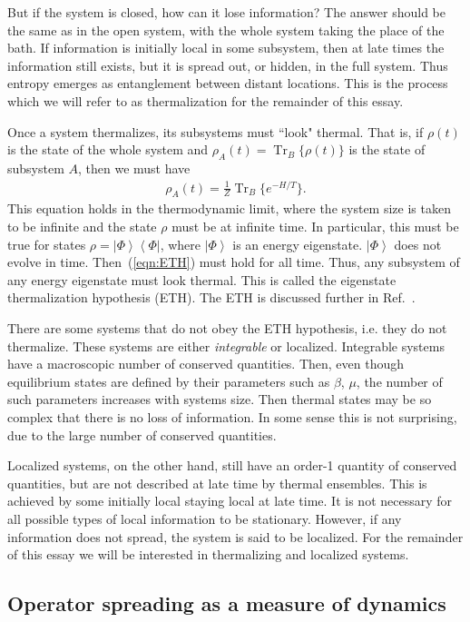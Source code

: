 \documentclass[a4paper,11pt]{article}
\renewcommand{\th}[1]{\frac{1}{#1}}
\newcommand{\ket}[1]{\left|#1\right\rangle}
\newcommand{\bra}[1]{\left\langle#1\right|}
\DeclareMathOperator{\Tr}{Tr}
\begin{document}
But if the system is closed, how can it lose information? The answer should be the same as in the open system, with the whole system taking the place of the bath. If information is initially local in some subsystem, then at late times the information still exists, but it is spread out, or hidden, in the full system. Thus entropy emerges as entanglement between distant locations. This is the process which we will refer to as thermalization for the remainder of this essay.

Once a system thermalizes, its subsystems must ``look" thermal. That is, if $\rho(t)$ is the state of the whole system and $\rho_A(t)=\Tr_B\{\rho(t)\}$ is the state of subsystem $A$, then we must have
\begin{align}
\rho_A(t) = \th{Z}\Tr_B\{e^{-H/T}\}. \label{eqn:ETH}
\end{align}
This equation holds in the thermodynamic limit, where the system size is taken to be infinite and the state $\rho$ must be at infinite time. In particular, this must be true for states $\rho=\ket{\Phi}\bra{\Phi}$, where $\ket{\Phi}$ is an energy eigenstate. $\ket{\Phi}$ does not evolve in time. Then~(\ref{eqn:ETH}) must hold for all time. Thus, any subsystem of any energy eigenstate must look thermal. This is called the eigenstate thermalization hypothesis (ETH). The ETH is discussed further in Ref.~\cite{Nandkishore14}.

There are some systems that do not obey the ETH hypothesis, i.e. they do not thermalize. These systems are either \emph{integrable} or localized. Integrable systems have a macroscopic number of conserved quantities. Then, even though equilibrium states are defined by their parameters such as $\beta$, $\mu$, the number of such parameters increases with systems size. Then thermal states may be so complex that there is no loss of information. In some sense this is not surprising, due to the large number of conserved quantities. 

Localized systems, on the other hand, still have an order-1 quantity of conserved quantities, but are not described at late time by thermal ensembles. This is achieved by some initially local staying local at late time. 
It is not necessary for all possible types of local information to be stationary. However, if any information does not spread, the system is said to be localized. For the remainder of this essay we will be interested in thermalizing and localized systems.

\subsection{Operator spreading as a measure of dynamics} \label{sub:opsp}
\end{document}
